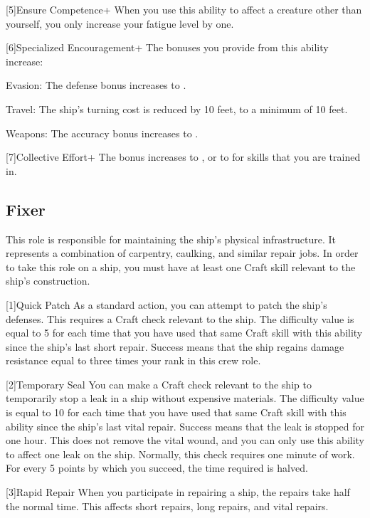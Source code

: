     [5]{Ensure Competence+} When you use this ability to affect a creature other than yourself, you only increase your fatigue level by one.

    [6]{Specialized Encouragement+} The bonuses you provide from this ability increase:
      \begin{raggeditemize}
        \item Evasion: The defense bonus increases to .
        \item Travel: The ship's turning cost is reduced by 10 feet, to a minimum of 10 feet.
        \item Weapons: The accuracy bonus increases to .
      \end{raggeditemize}

    [7]{Collective Effort+} The bonus increases to , or to  for skills that you are trained in.

  \subsection{Fixer}
    This role is responsible for maintaining the ship's physical infrastructure.
    It represents a combination of carpentry, caulking, and similar repair jobs.
    In order to take this role on a ship, you must have at least one Craft skill relevant to the ship's construction.

    [1]{Quick Patch} As a standard action, you can attempt to patch the ship's defenses.
      This requires a Craft check relevant to the ship.
      The difficulty value is equal to 5  for each time that you have used that same Craft skill with this ability since the ship's last short repair.
      Success means that the ship regains damage resistance equal to three times your rank in this crew role.

    [2]{Temporary Seal} You can make a Craft check relevant to the ship to temporarily stop a leak in a ship without expensive materials.
      The difficulty value is equal to 10  for each time that you have used that same Craft skill with this ability since the ship's last vital repair.
      Success means that the leak is stopped for one hour.
      This does not remove the vital wound, and you can only use this ability to affect one leak on the ship.
      Normally, this check requires one minute of work.
      For every 5 points by which you succeed, the time required is halved.

    [3]{Rapid Repair} When you participate in repairing a ship, the repairs take half the normal time.
      This affects short repairs, long repairs, and vital repairs.

